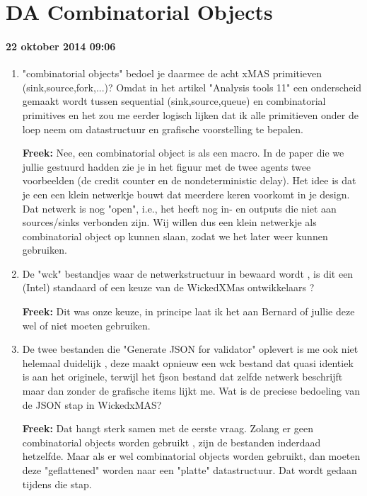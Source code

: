 \section{DA Combinatorial Objects}

\paragraph{22 oktober 2014 09:06}

\begin{enumerate}
\item "combinatorial objects" bedoel je daarmee de acht xMAS primitieven (sink,source,fork,...)? Omdat in het artikel "Analysis tools 11" een onderscheid gemaakt wordt tussen sequential (sink,source,queue) en combinatorial primitives en het zou me eerder logisch lijken dat ik alle primitieven onder de loep neem om datastructuur en grafische voorstelling te bepalen.

\textbf{Freek:} Nee, een combinatorial object is als een macro. In de paper die we jullie gestuurd hadden zie je in het figuur met de twee agents twee voorbeelden (de credit counter en de nondeterministic delay). Het idee is dat je een een klein netwerkje bouwt dat meerdere keren voorkomt in je design. Dat netwerk is nog "open", i.e., het heeft nog in- en outputs die niet aan sources/sinks verbonden zijn. Wij willen dus een klein netwerkje als combinatorial object op kunnen slaan, zodat we het later weer kunnen gebruiken.

\item De "wck" bestandjes waar de netwerkstructuur in bewaard wordt , is dit een (Intel) standaard of een keuze van de WickedXMas ontwikkelaars ?  

\textbf{Freek:} Dit was onze keuze, in principe laat ik het aan Bernard of jullie deze wel of niet moeten gebruiken.

\item De twee bestanden die "Generate JSON for validator" oplevert is me ook niet helemaal duidelijk , deze maakt opnieuw een wck bestand dat quasi identiek is aan het originele, terwijl het fjson bestand dat zelfde netwerk beschrijft maar dan zonder de grafische items lijkt me. Wat is de preciese bedoeling van de JSON stap in WickedxMAS? 

\textbf{Freek:} Dat hangt sterk samen met de eerste vraag. Zolang er geen combinatorial objects worden gebruikt , zijn de bestanden inderdaad hetzelfde. Maar als er wel combinatorial objects worden gebruikt, dan moeten deze "geflattened" worden naar een "platte" datastructuur. Dat wordt gedaan tijdens die stap.

\end{enumerate}


